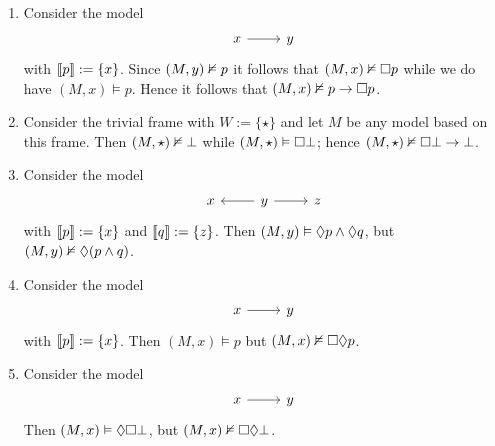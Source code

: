 \documentclass{article}
\begin{document}
\begin{ex}
\begin{enumerate}
\item Consider the model
\begin{equation*}
\begin{tikzcd}
x \rar & y
\end{tikzcd}
\end{equation*}
with $\llbracket p\rrbracket:=\{x\}$. Since $(M,y)\nvDash p$ it follows that $(M,x)
\nvDash\square p$ while we do have $(M,x)\models p$. Hence it follows that
$(M,x)\nvDash p\to\square p$.
\item Consider the trivial frame with $W:=\{\star\}$ and let $M$
be any model based on this frame. Then $(M,\star)\nvDash\bot$ while $(M,\star)
\vDash\square\bot$; hence $(M,\star)\nvDash\square\bot\to\bot$.
\item Consider the model
\begin{equation*}
\begin{tikzcd}
x & y \ar{l} \ar{r} & z
\end{tikzcd}
\end{equation*}
with $\llbracket p\rrbracket:=\{x\}$ and $\llbracket q\rrbracket:=\{z\}$. Then $(M,y)\vDash\lozenge p\land\lozenge q$, but $(M,y)\nvDash\lozenge(p\land q)$.
\item Consider the model
\begin{equation*}
\begin{tikzcd}
x \rar & y
\end{tikzcd}
\end{equation*}
with $\llbracket p\rrbracket:=\{x\}$. Then $(M,x)\models p$ but $(M,x)\nvDash\square\lozenge p$. 
\item Consider the model
\begin{equation*}
\begin{tikzcd}
x \rar & y
\end{tikzcd}
\end{equation*}
Then $(M,x)\vDash\lozenge\square\bot$, but $(M,x)\nvDash\square\lozenge\bot$. 
\end{enumerate}
\end{ex}
\end{document}

